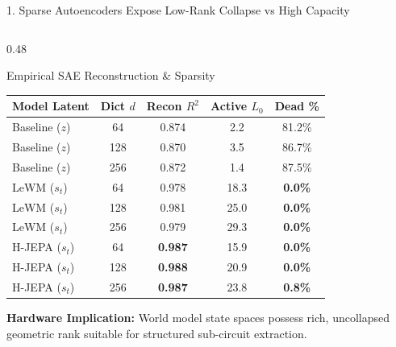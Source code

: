 \documentclass[aspectratio=169, 10pt]{beamer}
\begin{document}
\begin{frame}{1. Sparse Autoencoders Expose Low-Rank Collapse vs High Capacity}
\begin{columns}[T]
    \begin{column}{0.48\textwidth}
      \begin{block}{Empirical SAE Reconstruction \& Sparsity}
        \scriptsize
        \centering
        \setlength{\tabcolsep}{2.5pt}
        \begin{tabular}{lcccc}
          \toprule
          \textbf{Model Latent} & \textbf{Dict $d$} & \textbf{Recon $R^2$} & \textbf{Active $L_0$} & \textbf{Dead \%} \\
          \midrule
          Baseline ($z$) & 64 & 0.874 & 2.2 & \alert{81.2\%} \\
          Baseline ($z$) & 128 & 0.870 & 3.5 & \alert{86.7\%} \\
          Baseline ($z$) & 256 & 0.872 & 1.4 & \alert{87.5\%} \\
          \midrule
          LeWM ($s_t$) & 64 & 0.978 & 18.3 & \textbf{0.0\%} \\
          LeWM ($s_t$) & 128 & 0.981 & 25.0 & \textbf{0.0\%} \\
          LeWM ($s_t$) & 256 & 0.979 & 29.3 & \textbf{0.0\%} \\
          \midrule
          H-JEPA ($s_t$) & 64 & \textbf{0.987} & 15.9 & \textbf{0.0\%} \\
          H-JEPA ($s_t$) & 128 & \textbf{0.988} & 20.9 & \textbf{0.0\%} \\
          H-JEPA ($s_t$) & 256 & \textbf{0.987} & 23.8 & \textbf{0.8\%} \\
          \bottomrule
        \end{tabular}
      \end{block}
      \vspace{0.05cm}
      \scriptsize \textbf{Hardware Implication:} World model state spaces possess rich, uncollapsed geometric rank suitable for structured sub-circuit extraction.
    \end{column}
  \end{columns}
\end{frame}
\end{document}
